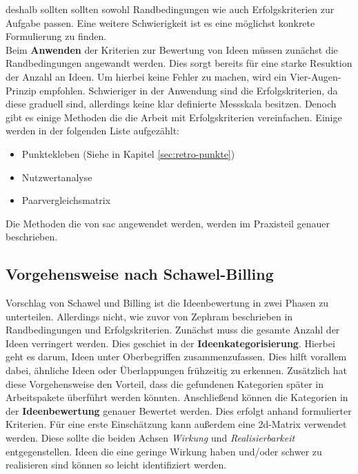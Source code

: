 deshalb sollten sollten sowohl Randbedingungen wie auch Erfolgskriterien zur Aufgabe passen. Eine weitere Schwierigkeit 
ist es eine möglichst konkrete Formulierung zu finden. \\
Beim \textbf{Anwenden} der Kriterien zur Bewertung von Ideen müssen zunächst die Randbedingungen angewandt werden. 
Dies sorgt bereits für eine starke Resuktion der Anzahl an Ideen. Um hierbei keine Fehler zu machen, wird 
ein Vier-Augen-Prinzip empfohlen. 
Schwieriger in der Anwendung sind die Erfolgskriterien, da diese graduell sind, allerdings keine klar definierte Messskala 
besitzen. Denoch gibt es einige Methoden die die Arbeit mit Erfolgskriterien vereinfachen. Einige werden 
in der folgenden Liste aufgezählt: 
\begin{itemize}
    \item Punktekleben (Siehe in Kapitel \ref{sec:retro-punkte})
    \item Nutzwertanalyse
    \item Paarvergleichsmatrix
\end{itemize}
Die Methoden die von \ac{sac} angewendet werden, werden im Praxisteil genauer beschrieben. \cite{zephram:2018}

\subsection{Vorgehensweise nach Schawel-Billing}
Vorschlag von Schawel und Billing ist die Ideenbewertung in zwei Phasen zu unterteilen. Allerdings nicht, 
wie zuvor von Zephram beschrieben in Randbedingungen und Erfolgskriterien. Zunächst muss die gesamte Anzahl 
der Ideen verringert werden. Dies geschiet in der \textbf{Ideenkategorisierung}. Hierbei geht es darum, Ideen unter 
Oberbegriffen zusammenzufassen. Dies hilft vorallem dabei, ähnliche Ideen oder Überlappungen frühzeitig zu erkennen.
Zusätzlich hat diese Vorgehensweise den Vorteil, dass die gefundenen Kategorien später in Arbeitspakete überführt werden 
könnten. Anschließend können die Kategorien in der \textbf{Ideenbewertung} genauer Bewertet werden. 
Dies erfolgt anhand formulierter Kriterien. Für eine erste Einschätzung kann außerdem eine \ac{2d}-Matrix verwendet werden. 
Diese sollte die beiden Achsen \textit{Wirkung} und \textit{Realisierbarkeit} entgegenstellen. Ideen die eine geringe Wirkung haben und/oder 
schwer zu realisieren sind können so leicht identifiziert werden. \cite{schawel:2009}
